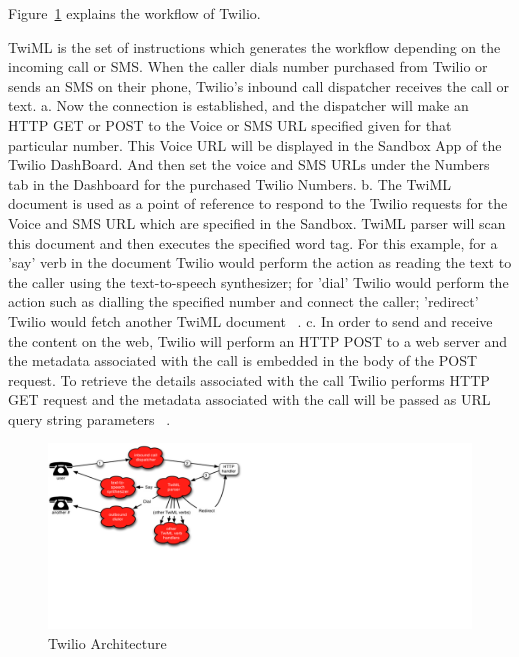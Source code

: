Figure~\ref{f:architecture} explains the workflow of Twilio.
  

TwiML is the set of instructions which generates the workflow depending on the 
incoming call or SMS. When the caller dials number purchased from Twilio 
or sends an SMS on their phone, Twilio's inbound call dispatcher receives the 
call or text. 
a. Now the connection is established, and the dispatcher will make an HTTP GET 
or POST to the Voice or SMS URL specified given for that particular number. 
This Voice URL will be displayed in the Sandbox App of the Twilio DashBoard. 
And then set the voice and SMS URLs under the Numbers tab in the Dashboard for 
the purchased Twilio Numbers.
b. The TwiML document is used as a point of reference to respond to the Twilio 
requests for the Voice and SMS URL which are specified in the Sandbox. TwiML 
parser will scan this document and then executes the specified word tag. For 
this example, for a 'say' verb in the document Twilio would perform the action 
as reading the text to the caller using the text-to-speech synthesizer; for 
'dial' Twilio would perform the action such as dialling the specified number 
and connect the caller; 'redirect' Twilio would fetch another TwiML document
~\cite{hid-sp18-406-twilio-architecture2}.
c. In order to send and receive the content on the web, Twilio will perform an 
HTTP POST to a web server and the metadata associated with the call is embedded
in the body of the POST request. To retrieve the details associated with the 
call Twilio performs HTTP GET request and the metadata associated with the call
will be passed as URL query string parameters
~\cite{hid-sp18-406-twilio-architecture3}.


\begin{figure}[!ht]
  \centering\includegraphics[width=\columnwidth]{image/Twilio-Architecture.png}
  \caption{Twilio Architecture~\cite{hid-sp18-406-twilio-architecture-image}}
\label{f:architecture}
\end{figure}




